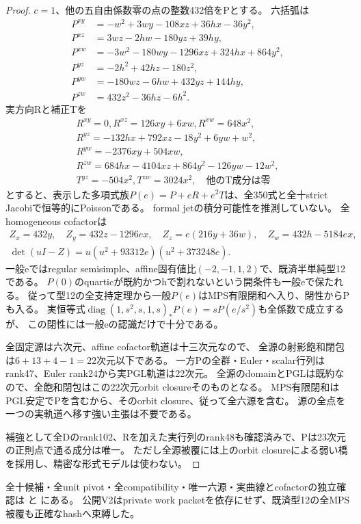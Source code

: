 \documentclass[a4paper,11pt]{ltjsarticle}
\theoremstyle{definition}
\begin{document}
\begin{proof}
$c=1$、他の五自由係数零の点の整数432倍をPとする。
六括弧は
\[
\begin{aligned}
 P^{xy}&=-w^2+3wy-108xz+36hx-36y^2,\\
 P^{xz}&=3wz-2hw-180yz+39hy,\\
 P^{xw}&=-3w^2-180wy-1296xz+324hx+864y^2,\\
 P^{yz}&=-2h^2+42hz-180z^2,\\
 P^{yw}&=-180wz-6hw+432yz+144hy,\\
 P^{zw}&=432z^2-36hz-6h^2.
\end{aligned}
\]
実方向Rと補正Tを
\[
\begin{gathered}
 R^{xy}=0,R^{xz}=126xy+6xw,R^{xw}=648x^2,\\
 R^{yz}=-132hx+792xz-18y^2+6yw+w^2,\\
 R^{yw}=-2376xy+504xw,\\
 R^{zw}=684hx-4104xz+864y^2-126yw-12w^2,\\
 T^{yz}=-504x^2,T^{zw}=3024x^2,
 \quad\text{他のT成分は零}
\end{gathered}
\]
とすると、表示した多項式族$P(e)=P+eR+e^2T$は、全350式と全十strict Jacobiで恒等的にPoissonである。
formal jetの積分可能性を推測していない。
全homogeneous cofactorは
\[
 \begin{gathered}
 Z_x=432y,\quad Z_y=432z-1296ex,\quad
 Z_z=e(216y+36w),\quad Z_w=432h-5184ex,\\
 \det(uI-Z)=u(u^2+93312e)(u^2+373248e).
 \end{gathered}
\]
一般eではregular semisimple、affine固有値比$(-2,-1,1,2)$で、既済半単純型12である。
$P(0)$のquarticが既約かつhで割れないという開条件も一般eで保たれる。
従って型12の全支持定理から一般$P(e)$はMPS有限閉和へ入り、閉性からPも入る。
実恒等式$\operatorname{diag}(1,s^2,s,1,s)_*P(e)=sP(e/s^2)$も全係数で成立するが、
この閉性には一般eの認識だけで十分である。

全固定源は六次元、affine cofactor軌道は十三次元なので、
全源の射影飽和閉包は$6+13+4-1=22$次元以下である。
一方Pの全群・Euler・scalar行列はrank47、Euler rank24から実PGL軌道は22次元。
全源のdomainとPGLは既約なので、全飽和閉包はこの22次元orbit closureそのものとなる。
MPS有限閉和はPGL安定でPを含むから、そのorbit closure、従って全六源を含む。
源の全点を一つの実軌道へ移す強い主張は不要である。

補強として全Dのrank102、Rを加えた実行列のrank48も確認済みで、Pは23次元の正則点で通る成分は唯一。
ただし全源被覆には上のorbit closureによる弱い橋を採用し、精密な形式モデルは使わない。
\end{proof}
全十候補・全unit pivot・全compatibility・唯一六源・実曲線とcofactorの独立確認は
と
にある。
公開V2はprivate work packetを依存にせず、既済型12の全MPS被覆も正確なhashへ束縛した。
\end{document}
